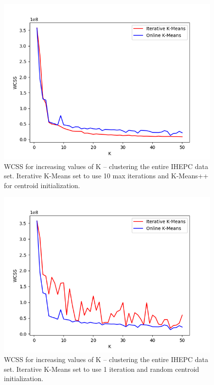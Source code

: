 \documentclass{l4proj}
\begin{document}
\begin{appendices}
\begin{figure}[H]
	\centering
    \label{fig:res6}
    \includegraphics[width=1.0\textwidth]{images/result6}
    \caption{WCSS for increasing values of K -- clustering the entire IHEPC data set. Iterative K-Means set to use 10 max iterations and K-Means++ for centroid initialization. } 
\end{figure}

\begin{figure}[H]
	\centering
    \label{fig:res7}
    \includegraphics[width=1.0\textwidth]{images/result7}
    \caption{WCSS for increasing values of K -- clustering the entire IHEPC data set. Iterative K-Means set to use 1 iteration and random centroid initialization. } 
\end{figure}


\end{appendices}
\end{document}
